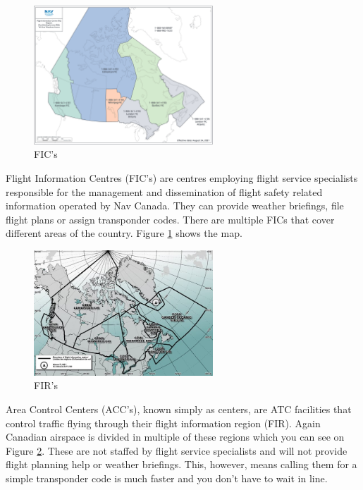 \documentclass[12pt,letterpaper]{article}
\begin{document}
        \begin{figure}[h]
          \begin{center}
            \includegraphics[width=0.6\textwidth]{fics.jpg}
          \end{center}
          \caption{FIC's}
          \label{fig:fics}
        \end{figure}

        Flight Information Centres (FIC's) are centres employing flight service specialists responsible for the management and dissemination of flight safety related information operated by Nav Canada. They can provide weather briefings, file flight plans or assign transponder codes. There are multiple FICs that cover different areas of the country. Figure \ref{fig:fics} shows the map.
        
        \begin{figure}[h]
          \begin{center}
            \includegraphics[width=0.6\textwidth]{firs.jpg}
          \end{center}
          \caption{FIR's}
          \label{fig:firs}
        \end{figure}

        Area Control Centers (ACC's), known simply as centers, are ATC facilities that control traffic flying through their flight information region (FIR). Again Canadian airspace is divided in multiple of these regions which you can see on Figure \ref{fig:firs}. These are not staffed by flight service specialists and will not provide flight planning help or weather briefings. This, however, means calling them for a simple transponder code is much faster and you don't have to wait in line.
        
\end{document}
